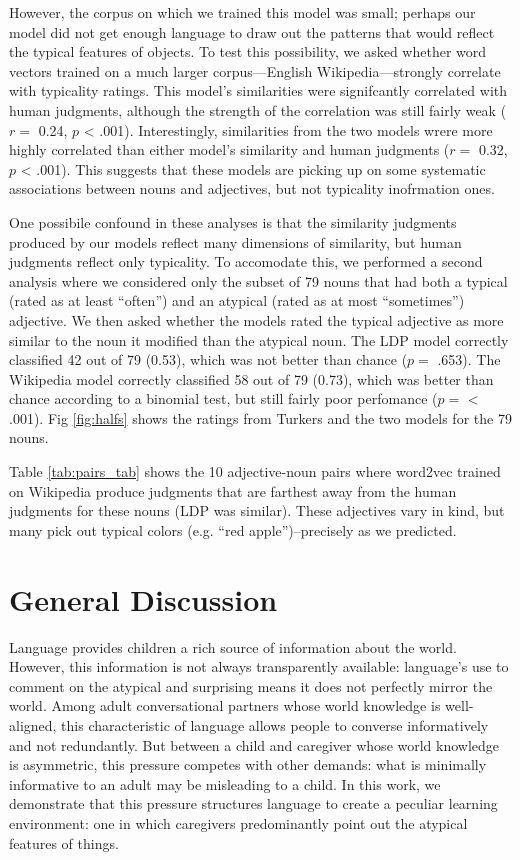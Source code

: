 \documentclass[10pt, letterpaper]{article}
\begin{document}
However, the corpus on which we trained this model was small; perhaps
our model did not get enough language to draw out the patterns that
would reflect the typical features of objects. To test this possibility,
we asked whether word vectors trained on a much larger corpus---English
Wikipedia---strongly correlate with typicality ratings. This model's
similarities were signifcantly correlated with human judgments, although
the strength of the correlation was still fairly weak (\(r =\) 0.24,
\(p\) \textless{} .001). Interestingly, similarities from the two models
wrere more highly correlated than either model's similarity and human
judgments (\(r =\) 0.32, \(p\) \textless{} .001). This suggests that
these models are picking up on some systematic associations between
nouns and adjectives, but not typicality inofrmation ones.

One possibile confound in these analyses is that the similarity
judgments produced by our models reflect many dimensions of similarity,
but human judgments reflect only typicality. To accomodate this, we
performed a second analysis where we considered only the subset of 79
nouns that had both a typical (rated as at least ``often'') and an
atypical (rated as at most ``sometimes'') adjective. We then asked
whether the models rated the typical adjective as more similar to the
noun it modified than the atypical noun. The LDP model correctly
classified 42 out of 79 (0.53), which was not better than chance
(\(p =\) .653). The Wikipedia model correctly classified 58 out of 79
(0.73), which was better than chance according to a binomial test, but
still fairly poor perfomance (\(p =\) \textless{} .001). Fig
\ref{fig:halfs} shows the ratings from Turkers and the two models for
the 79 nouns.

Table \ref{tab:pairs_tab} shows the 10 adjective-noun pairs where
word2vec trained on Wikipedia produce judgments that are farthest away
from the human judgments for these nouns (LDP was similar). These
adjectives vary in kind, but many pick out typical colors (e.g. ``red
apple'')--precisely as we predicted.

\hypertarget{general-discussion}{%
\section{General Discussion}\label{general-discussion}}

Language provides children a rich source of information about the world.
However, this information is not always transparently available:
language's use to comment on the atypical and surprising means it does
not perfectly mirror the world. Among adult conversational partners
whose world knowledge is well-aligned, this characteristic of language
allows people to converse informatively and not redundantly. But between
a child and caregiver whose world knowledge is asymmetric, this pressure
competes with other demands: what is minimally informative to an adult
may be misleading to a child. In this work, we demonstrate that this
pressure structures language to create a peculiar learning environment:
one in which caregivers predominantly point out the atypical features of
things.
\end{document}

